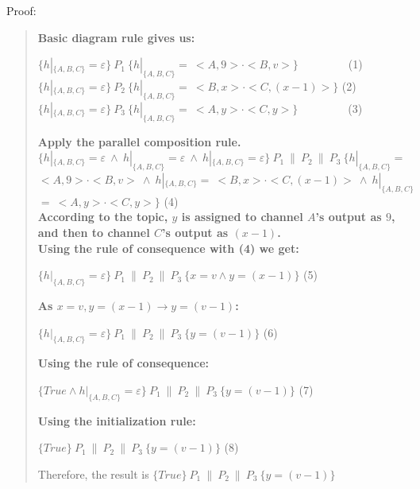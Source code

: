 \documentclass{article}
\begin{document}
\begin{Question} 
\begin{answer}
Proof:
    \begin{quote}
        \textbf{Basic diagram rule gives us:}
        \begin{center}
            $\{h|_{\{A, B, C\}} = \varepsilon\}\ P_1\ \{h|_{\{A, B, C\}} =\ <A, 9>\cdot <B, v>\} $\ \ \ \ \ \ \ \ \ (1)\vspace{1ex}\\
            $\{h|_{\{A, B, C\}} = \varepsilon\}\ P_2\ \{h|_{\{A, B, C\}} =\ <B, x>\cdot <C, (x-1)>\} $  (2)\vspace{1ex}\\
            $\{h|_{\{A, B, C\}} = \varepsilon\}\ P_3\ \{h|_{\{A, B, C\}} =\ <A, y>\cdot <C, y>\} $\ \ \ \ \ \ \ \ \ (3)\\
        \end{center}
        \textbf{Apply the parallel composition rule.}\vspace{1ex}\\
        $\{h|_{\{A, B, C\}} = \varepsilon\ \land\ h|_{\{A, B, C\}} = \varepsilon\ \land\ h|_{\{A, B, C\}} = \varepsilon\}\ P_1\ \|\ P_2\ \|\ P_3\ \{ h|_{\{A, B, C\}} =$\vspace{1ex}\\$<A, 9>\cdot <B, v>\ \land\  h|_{\{A, B, C\}} =\ <B, x>\cdot <C, (x-1)>\ \land\ h|_{\{A, B, C\}}$\vspace{1ex}\\$ =\ <A, y>\cdot <C, y>\}$ (4)\vspace{1ex}\\
        \textbf{According to the topic, $y$ is assigned to channel $A$'s output as $9$, and then to channel $C$'s output as $(x-1)$.}\\
        \textbf{Using the rule of consequence with (4) we get:}
        \begin{center}
            $\{h|_{\{A, B, C\}} = \varepsilon\}\ P_1\ \|\ P_2\ \|\ P_3\ \{ x = v \land y = (x-1)\}$ (5)\\
        \end{center}
        \textbf{As $x=v, y=(x-1) \rightarrow y = (v-1)$:}
        \begin{center}
            $\{h|_{\{A, B, C\}} = \varepsilon\}\ P_1\ \|\ P_2\ \|\ P_3\ \{ y = (v-1)\}$ (6)\\
        \end{center}
        \textbf{Using the rule of consequence:}
        \begin{center}
            $\{True \land h|_{\{A, B, C\}} = \varepsilon\}\ P_1\ \|\ P_2\ \|\ P_3\ \{ y = (v-1)\}$ (7)\\
        \end{center}
        \textbf{Using the initialization rule:}
        \begin{center}
            $\{True\}\ P_1\ \|\ P_2\ \|\ P_3\ \{ y = (v-1)\}$ (8)\\
        \end{center}
        Therefore, the result is $\{True\}\ P_1\ \|\ P_2\ \|\ P_3\ \{ y = (v-1)\}$ \\
    \end{quote}
\end{answer}
\end{Question}
\end{document}
